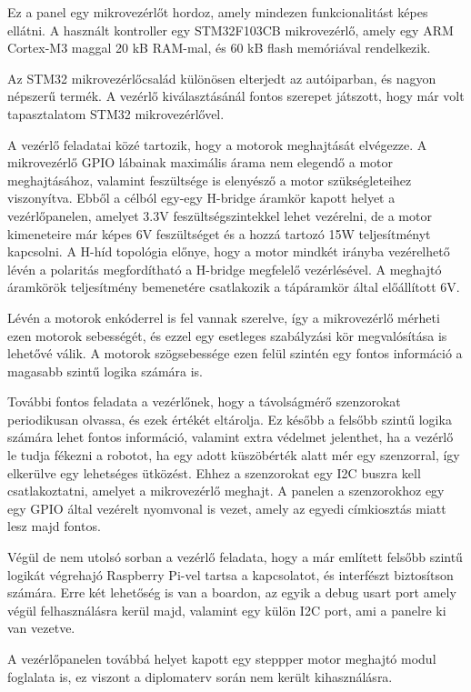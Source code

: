 Ez a panel egy mikrovezérlőt hordoz, amely mindezen funkcionalitást képes
ellátni. A használt kontroller egy STM32F103CB mikrovezérlő, amely egy
ARM Cortex-M3 maggal 20 kB RAM-mal, és 60 kB flash memóriával rendelkezik.

Az STM32 mikrovezérlőcsalád különösen elterjedt az autóiparban, és nagyon
népszerű termék. A vezérlő kiválasztásánál fontos szerepet játszott, hogy már
volt tapasztalatom STM32 mikrovezérlővel.

\medskip

A vezérlő feladatai közé tartozik, hogy a motorok meghajtását elvégezze. A
mikrovezérlő GPIO lábainak maximális árama nem elegendő a motor meghajtásához,
valamint feszültsége is elenyésző a motor szükségleteihez viszonyítva. Ebből a
célból egy-egy H-bridge áramkör kapott helyet a vezérlőpanelen, amelyet 3.3V
feszültségszintekkel lehet vezérelni, de a motor kimeneteire már képes 6V
feszültséget és a hozzá tartozó 15W teljesítményt kapcsolni. A H-híd topológia
előnye, hogy a motor mindkét irányba vezérelhető lévén a polaritás megfordítható
a H-bridge megfelelő vezérlésével. A meghajtó áramkörök teljesítmény bemenetére
csatlakozik a tápáramkör által előállított 6V.

Lévén a motorok enkóderrel is fel vannak szerelve, így a mikrovezérlő mérheti
ezen motorok sebességét, és ezzel egy esetleges szabályzási kör megvalósítása is
lehetővé válik. A motorok szögsebessége ezen felül szintén egy fontos információ
a magasabb szintű logika számára is.

További fontos feladata a vezérlőnek, hogy a távolságmérő szenzorokat
periodikusan olvassa, és ezek értékét eltárolja. Ez később a felsőbb szintű
logika számára lehet fontos információ, valamint extra védelmet jelenthet, ha a
vezérlő le tudja fékezni a robotot, ha egy adott küszöbérték alatt mér egy
szenzorral, így elkerülve egy lehetséges ütközést. Ehhez a szenzorokat egy I2C
buszra kell csatlakoztatni, amelyet a mikrovezérlő meghajt. A panelen a
szenzorokhoz egy egy GPIO által vezérelt nyomvonal is vezet, amely az egyedi
címkiosztás miatt lesz majd fontos.

Végül de nem utolsó sorban a vezérlő feladata, hogy a már említett felsőbb szintű
logikát végrehajó Raspberry Pi-vel tartsa a kapcsolatot, és interfészt
biztosítson számára. Erre két lehetőség is van a boardon, az egyik a debug usart
port amely végül felhasználásra kerül majd, valamint egy külön I2C port, ami a
panelre ki van vezetve.

A vezérlőpanelen továbbá helyet kapott egy steppper motor meghajtó modul
foglalata is, ez viszont a diplomaterv során nem került kihasználásra.

